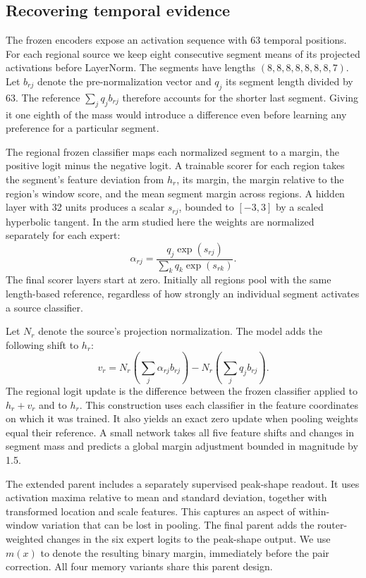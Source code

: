 \documentclass{article}
\begin{document}
\subsection{Recovering temporal evidence}
The frozen encoders expose an activation sequence with 63 temporal positions. For each regional source we keep eight consecutive segment means of its projected activations before LayerNorm. The segments have lengths $(8,8,8,8,8,8,8,7)$. Let $b_{rj}$ denote the pre-normalization vector and $q_j$ its segment length divided by 63. The reference $\sum_j q_j b_{rj}$ therefore accounts for the shorter last segment. Giving it one eighth of the mass would introduce a difference even before learning any preference for a particular segment.

The regional frozen classifier maps each normalized segment to a margin, the positive logit minus the negative logit. A trainable scorer for each region takes the segment's feature deviation from $h_r$, its margin, the margin relative to the region's window score, and the mean segment margin across regions. A hidden layer with 32 units produces a scalar $s_{rj}$, bounded to $[-3,3]$ by a scaled hyperbolic tangent. In the arm studied here the weights are normalized separately for each expert:
\begin{equation}
  \alpha_{rj}=\frac{q_j\exp(s_{rj})}{\sum_k q_k\exp(s_{rk})}.
\end{equation}
The final scorer layers start at zero. Initially all regions pool with the same length-based reference, regardless of how strongly an individual segment activates a source classifier.

Let $N_r$ denote the source's projection normalization. The model adds the following shift to $h_r$:
\begin{equation}
  v_r=N_r\!\left(\sum_j\alpha_{rj} b_{rj}\right)
       -N_r\!\left(\sum_j q_j b_{rj}\right).
\end{equation}
The regional logit update is the difference between the frozen classifier applied to $h_r+v_r$ and to $h_r$. This construction uses each classifier in the feature coordinates on which it was trained. It also yields an exact zero update when pooling weights equal their reference. A small network takes all five feature shifts and changes in segment mass and predicts a global margin adjustment bounded in magnitude by 1.5.

The extended parent includes a separately supervised peak-shape readout. It uses activation maxima relative to mean and standard deviation, together with transformed location and scale features. This captures an aspect of within-window variation that can be lost in pooling. The final parent adds the router-weighted changes in the six expert logits to the peak-shape output. We use $m(x)$ to denote the resulting binary margin, immediately before the pair correction. All four memory variants share this parent design.
\end{document}
